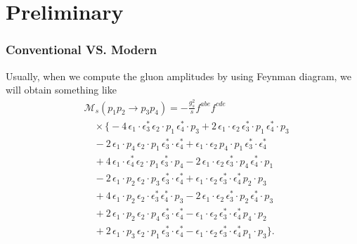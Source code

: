 \documentclass{beamer}
\begin{document}
\begin{frame}
\begin{center}
\end{center}
\end{frame}
\section{Preliminary}
\begin{frame}
    \frametitle{Conventional VS. Modern}
    Usually, when we compute the gluon amplitudes by using Feynman diagram, we will obtain something like 
\begin{equation*}
    \begin{aligned}
&\mathcal{M}_s(p_1 p_2 \to p_3 p_4) = - \frac{g_s^2}{s} f^{abe} f^{cde} \\
&\quad \times \Big\{ 
-4\, \epsilon_1 \cdot \epsilon_3^* \, \epsilon_2 \cdot p_1 \, \epsilon_4^* \cdot p_3 
+ 2\, \epsilon_1 \cdot \epsilon_2 \, \epsilon_3^* \cdot p_1 \, \epsilon_4^* \cdot p_3 \\
&\quad - 2\, \epsilon_1 \cdot p_4 \, \epsilon_2 \cdot p_1 \, \epsilon_3^* \cdot \epsilon_4^*
+ \epsilon_1 \cdot \epsilon_2 \, p_4 \cdot p_1 \, \epsilon_3^* \cdot \epsilon_4^* \\
&\quad + 4\, \epsilon_1 \cdot \epsilon_4^* \, \epsilon_2 \cdot p_1 \, \epsilon_3^* \cdot p_4 
- 2\, \epsilon_1 \cdot \epsilon_2 \, \epsilon_3^* \cdot p_4 \, \epsilon_4^* \cdot p_1 \\
&\quad - 2\, \epsilon_1 \cdot p_2 \, \epsilon_2 \cdot p_3 \, \epsilon_3^* \cdot \epsilon_4^*
+ \epsilon_1 \cdot \epsilon_2 \, \epsilon_3^* \cdot \epsilon_4^* \, p_2 \cdot p_3 \\
&\quad + 4\, \epsilon_1 \cdot p_2 \, \epsilon_2 \cdot \epsilon_3^* \, \epsilon_4^* \cdot p_3 
- 2\, \epsilon_1 \cdot \epsilon_2 \, \epsilon_3^* \cdot p_2 \, \epsilon_4^* \cdot p_3 \\
&\quad + 2\, \epsilon_1 \cdot p_2 \, \epsilon_2 \cdot p_4 \, \epsilon_3^* \cdot \epsilon_4^* 
- \epsilon_1 \cdot \epsilon_2 \, \epsilon_3^* \cdot \epsilon_4^* \, p_4 \cdot p_2 \\
&\quad + 2\, \epsilon_1 \cdot p_3 \, \epsilon_2 \cdot p_1 \, \epsilon_3^* \cdot \epsilon_4^* 
- \epsilon_1 \cdot \epsilon_2 \, \epsilon_3^* \cdot \epsilon_4^* \, p_1 \cdot p_3 
\Big\}.
\end{aligned}
\end{equation*}
\end{frame}
\end{document}
